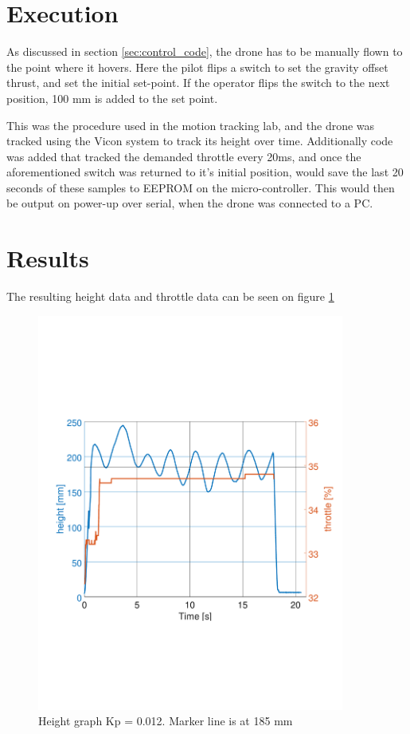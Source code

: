 \section*{Execution}
As discussed in section \ref{sec:control_code}, the drone has to be manually flown to the point where it hovers. Here the pilot flips a switch to set the gravity offset thrust, and set the initial set-point. If the operator flips the switch to the next position, 100 mm is added to the set point.

This was the procedure used in the motion tracking lab, and the drone was tracked using the Vicon system to track its height over time. Additionally code was added that tracked the demanded throttle every 20ms, and once the aforementioned switch was returned to it's initial position, would save the last 20 seconds of these samples to EEPROM on the micro-controller. This would then be output on power-up over serial, when the drone was connected to a PC.

\section*{Results}
The resulting height data and throttle data can be seen on figure \ref{fig:first_test}

\begin{figure}[H]
    \centering
    \includegraphics[width=0.9\textwidth, trim={0 7cm 0 7cm},clip]{figures/Appendix/final_test/kp0,012.pdf}
    \caption{Height graph Kp = 0.012. Marker line is at 185 mm}
    \label{fig:first_test}
\end{figure}

